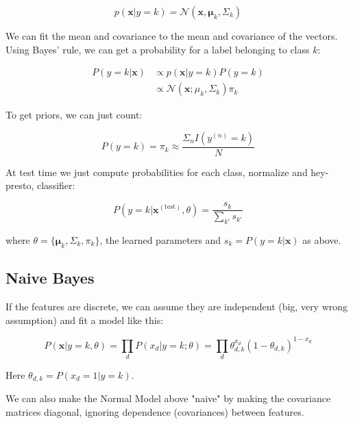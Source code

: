 \documentclass{article}
\newcommand{\vf}[1]{\mathbf{#1}}
\newcommand{\bx}{\vf{x}}
\newcommand{\bmu}{\pmb{\mu}}
\newcommand{\gauss}{\mathcal{N}}
\begin{document}
\begin{equation*}
    p(\bx | y=k) = \gauss(\bx, \bmu_k, \Sigma_k)
\end{equation*}

We can fit the mean and covariance to the mean and covariance of the vectors. Using Bayes' rule, we can get a probability for a label belonging to class $k$:

\begin{align*}
    P(y=k | \bx) &\propto p(\bx | y = k) P(y = k) \\
                 &\propto \gauss(\bx; \mu_k, \Sigma_k) \pi_k
\end{align*}

To get priors, we can just count:

\begin{equation*}
    P(y = k) = \pi_k \approx \frac
        {\Sigma_n I(y^{(n)} = k)}
        {N}
\end{equation*}

At test time we just compute probabilities for each class, normalize and hey-presto, classifier:

\begin{equation*}
    P(y = k | \bx^{(\text{test})}, \theta) = \frac
        {s_k}
        {\sum_{k'} s_{k'}}
\end{equation*}

where $\theta = \{\bmu_k, \Sigma_k, \pi_k\}$, the learned parameters and $s_k = P(y = k | \bx)$ as above.

\subsection{Naive Bayes}
If the features are discrete, we can assume they are independent (big, very wrong assumption) and fit a model like this:

\begin{equation*}
    P(\bx | y = k, \theta) = \prod_d P(x_d | y = k; \theta)
        = \prod_d \theta_{d, k}^{x_d} (1 - \theta_{d, k})^{1 - x_d}
\end{equation*}

Here $\theta_{d,k} = P(x_d = 1| y = k)$.

\vskip 0.1in
We can also make the Normal Model above "naive" by making the covariance matrices diagonal, ignoring dependence (covariances) between features.
\end{document}
